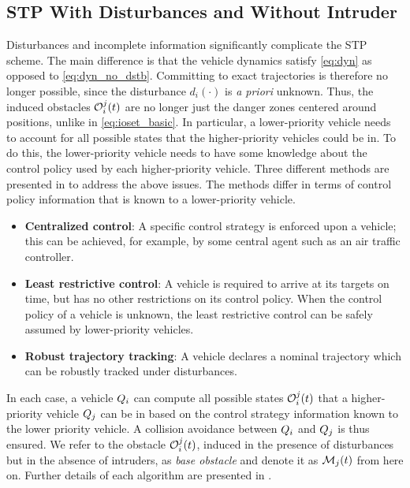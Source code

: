 \subsection{STP With Disturbances and Without Intruder\label{sec:distb}}
Disturbances and incomplete information significantly complicate the STP scheme. The main difference is that the vehicle dynamics satisfy \eqref{eq:dyn} as opposed to \eqref{eq:dyn_no_dstb}. Committing to exact trajectories is therefore no longer possible, since the disturbance $d_i(\cdot)$ is \textit{a priori} unknown. Thus, the induced obstacles $\mathcal{O}_i^j(t)$ are no longer just the danger zones centered around positions, unlike in \eqref{eq:ioset_basic}. In particular, a lower-priority vehicle needs to account for all possible states that the higher-priority vehicles could be in. To do this, the lower-priority vehicle needs to have some knowledge about the control policy used by each higher-priority vehicle. Three different methods are presented in \cite{Bansal2017} to address the above issues. The methods differ in terms of control policy information that is known to a lower-priority vehicle.
\begin{itemize}
\item \textbf{Centralized control}: A specific control strategy is enforced upon a vehicle; this can be achieved, for example, by some central agent such as an air traffic controller. 
\item \textbf{Least restrictive control}: A vehicle is required to arrive at its targets on time, but has no other restrictions on its control policy. When the control policy of a vehicle is unknown, the least restrictive control can be safely assumed by lower-priority vehicles.
\item \textbf{Robust trajectory tracking}: A vehicle declares a nominal trajectory which can be robustly tracked under disturbances.
\end{itemize}
In each case, a vehicle $Q_i$ can compute all possible states $\mathcal{O}_i^j(t)$ that a higher-priority vehicle $Q_j$ can be in based on the control strategy information known to the lower priority vehicle. A collision avoidance between $Q_i$ and $Q_j$ is thus ensured. We refer to the obstacle $\mathcal{O}_i^j(t)$, induced in the presence of disturbances but in the absence of intruders, as \textit{base obstacle} and denote it as $\mathcal{M}_j(t)$ from here on. Further details of each algorithm are presented in \cite{Bansal2017}.
